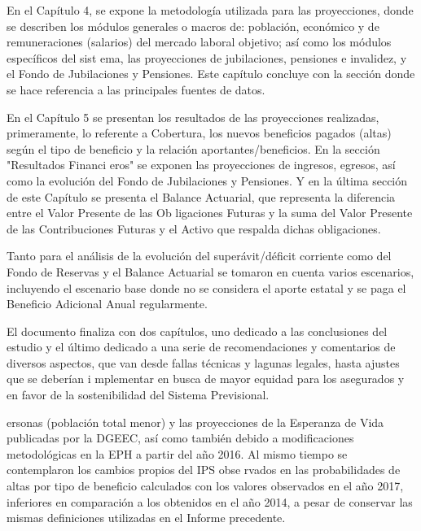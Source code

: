 \documentclass[a4paper,11pt]{article}
\begin{document}
En el Capítulo 4, se expone la metodología utilizada para las proyecciones, donde se describen los módulos generales o macros de: población, económico y de remuneraciones (salarios) del mercado laboral objetivo; así como los módulos específicos del sist
ema, las proyecciones de jubilaciones, pensiones e invalidez, y el Fondo de Jubilaciones y Pensiones.  Este capítulo concluye con la sección donde se hace referencia a las principales fuentes de datos.

En el Capítulo 5 se presentan los resultados de las proyecciones realizadas, primeramente, lo referente a Cobertura, los nuevos beneficios pagados (altas) según el tipo de beneficio y la relación aportantes/beneficios.  En la sección "Resultados Financi
eros" se exponen las proyecciones de ingresos, egresos, así como la evolución del Fondo de Jubilaciones y Pensiones. Y en la última sección de este Capítulo se presenta el Balance Actuarial, que representa la diferencia entre el Valor Presente de las Ob
ligaciones Futuras y la suma del Valor Presente de las Contribuciones Futuras y el Activo que respalda dichas obligaciones.

Tanto para el análisis de la evolución del superávit/déficit corriente como del Fondo de Reservas y el Balance Actuarial se tomaron en cuenta varios escenarios, incluyendo el escenario base donde no se considera el aporte estatal y se paga el Beneficio 
Adicional Anual regularmente.

El documento finaliza con dos capítulos, uno dedicado a las conclusiones del estudio y el último dedicado a una serie de recomendaciones y comentarios de diversos aspectos, que van desde fallas técnicas y lagunas legales, hasta ajustes que se deberían i
mplementar en busca de mayor equidad para los asegurados y en favor de la sostenibilidad del Sistema Previsional.


ersonas (población total menor) y las proyecciones de la Esperanza de Vida publicadas por la DGEEC, así como también debido a modificaciones metodológicas en la EPH a partir del año 2016.  Al mismo tiempo se contemplaron los cambios propios del IPS obse
rvados en las probabilidades de altas por tipo de beneficio calculados con los valores observados en el año 2017, inferiores en comparación a los obtenidos en el año 2014, a pesar de conservar las mismas definiciones utilizadas en el Informe precedente.
 

%
\newpage
%
\newpage

\newpage

\newpage

\newpage

\newpage

\newpage

\newpage

\end{document}
